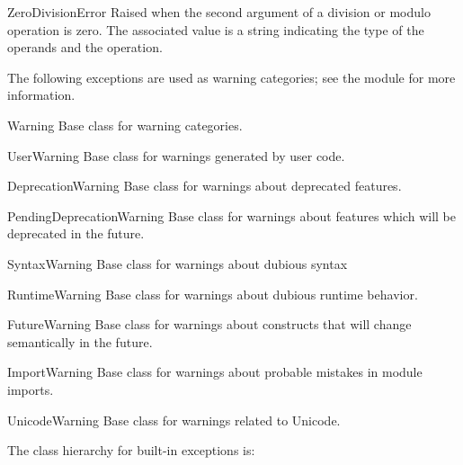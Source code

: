 \begin{excdesc}{ZeroDivisionError}
  Raised when the second argument of a division or modulo operation is
  zero.  The associated value is a string indicating the type of the
  operands and the operation.
\end{excdesc}



The following exceptions are used as warning categories; see the
 module for more information.

\begin{excdesc}{Warning}
Base class for warning categories.
\end{excdesc}

\begin{excdesc}{UserWarning}
Base class for warnings generated by user code.
\end{excdesc}

\begin{excdesc}{DeprecationWarning}
Base class for warnings about deprecated features.
\end{excdesc}

\begin{excdesc}{PendingDeprecationWarning}
Base class for warnings about features which will be deprecated in the future.
\end{excdesc}

\begin{excdesc}{SyntaxWarning}
Base class for warnings about dubious syntax
\end{excdesc}

\begin{excdesc}{RuntimeWarning}
Base class for warnings about dubious runtime behavior.
\end{excdesc}

\begin{excdesc}{FutureWarning}
Base class for warnings about constructs that will change semantically
in the future.
\end{excdesc}

\begin{excdesc}{ImportWarning}
Base class for warnings about probable mistakes in module imports.
\end{excdesc}

\begin{excdesc}{UnicodeWarning}
Base class for warnings related to Unicode.
\end{excdesc}

The class hierarchy for built-in exceptions is:


